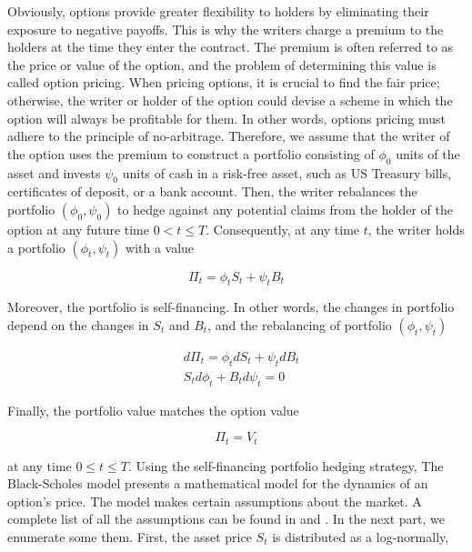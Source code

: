Obviously, options provide greater flexibility to holders by eliminating their 
exposure to negative payoffs. This is why the writers charge a premium to the holders
at the time they enter the contract. The premium is often referred to as the price 
or value of the option, and the problem of determining 
this value is called option pricing. When pricing options, it is crucial to find
the fair price; otherwise, the writer or holder of the option could devise a 
scheme in which the option will always be profitable for them. In other words,
options pricing must adhere to the principle of no-arbitrage. Therefore, we 
assume that the writer of the option uses the premium to construct a portfolio 
consisting of $\phi_0$ units of the asset and invests $\psi_0$ units of cash in 
a risk-free asset, such as US Treasury bills, certificates of deposit, or a bank 
account. Then, the writer rebalances the portfolio $(\phi_0, \psi_0)$ to hedge 
against any potential claims from the holder of the option at any future time 
$0 < t \le T$. Consequently, at any time $t$, the writer holds a portfolio 
$(\phi_t, \psi_t)$ with a value

\begin{equation}
  \Pi_t = \phi_t S_t + \psi_t B_t
\end{equation}

Moreover, the portfolio is self-financing. In other words, the changes in
portfolio depend on the changes in $S_t$ and $B_t$, 
and the rebalancing of portfolio $(\phi_t, \psi_t)$

\begin{align*}
  & d\Pi_t = \phi_tdS_t + \psi_t dB_t \\
  & S_t d\phi_t + B_t d\psi_t = 0
\end{align*}

Finally, the portfolio value matches the option value

\begin{equation}
  \Pi_t = V_t
\end{equation}

at any time $0 \le t \le T$. Using the self-financing portfolio hedging 
strategy, The Black-Scholes model presents a mathematical model for the dynamics of an option's price. 
The model makes certain assumptions about the market. A complete list of all the
assumptions can be found in \cite{seydel_2009} and \cite{wilmott_howison_dewynne_1995}. 
In the next part, we enumerate some them. 
First, the 
asset price $S_t$ is distributed as a log-normally,

